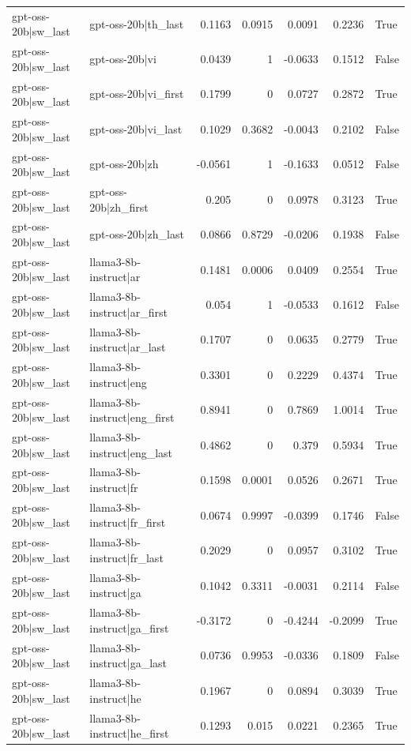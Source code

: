 \begin{table}
\begin{tabular}{l l r r r r l}
gpt-oss-20b|sw_last & gpt-oss-20b|th_last & 0.1163 & 0.0915 & 0.0091 & 0.2236 & True \\
gpt-oss-20b|sw_last & gpt-oss-20b|vi & 0.0439 & 1 & -0.0633 & 0.1512 & False \\
gpt-oss-20b|sw_last & gpt-oss-20b|vi_first & 0.1799 & 0 & 0.0727 & 0.2872 & True \\
gpt-oss-20b|sw_last & gpt-oss-20b|vi_last & 0.1029 & 0.3682 & -0.0043 & 0.2102 & False \\
gpt-oss-20b|sw_last & gpt-oss-20b|zh & -0.0561 & 1 & -0.1633 & 0.0512 & False \\
gpt-oss-20b|sw_last & gpt-oss-20b|zh_first & 0.205 & 0 & 0.0978 & 0.3123 & True \\
gpt-oss-20b|sw_last & gpt-oss-20b|zh_last & 0.0866 & 0.8729 & -0.0206 & 0.1938 & False \\
gpt-oss-20b|sw_last & llama3-8b-instruct|ar & 0.1481 & 0.0006 & 0.0409 & 0.2554 & True \\
gpt-oss-20b|sw_last & llama3-8b-instruct|ar_first & 0.054 & 1 & -0.0533 & 0.1612 & False \\
gpt-oss-20b|sw_last & llama3-8b-instruct|ar_last & 0.1707 & 0 & 0.0635 & 0.2779 & True \\
gpt-oss-20b|sw_last & llama3-8b-instruct|eng & 0.3301 & 0 & 0.2229 & 0.4374 & True \\
gpt-oss-20b|sw_last & llama3-8b-instruct|eng_first & 0.8941 & 0 & 0.7869 & 1.0014 & True \\
gpt-oss-20b|sw_last & llama3-8b-instruct|eng_last & 0.4862 & 0 & 0.379 & 0.5934 & True \\
gpt-oss-20b|sw_last & llama3-8b-instruct|fr & 0.1598 & 0.0001 & 0.0526 & 0.2671 & True \\
gpt-oss-20b|sw_last & llama3-8b-instruct|fr_first & 0.0674 & 0.9997 & -0.0399 & 0.1746 & False \\
gpt-oss-20b|sw_last & llama3-8b-instruct|fr_last & 0.2029 & 0 & 0.0957 & 0.3102 & True \\
gpt-oss-20b|sw_last & llama3-8b-instruct|ga & 0.1042 & 0.3311 & -0.0031 & 0.2114 & False \\
gpt-oss-20b|sw_last & llama3-8b-instruct|ga_first & -0.3172 & 0 & -0.4244 & -0.2099 & True \\
gpt-oss-20b|sw_last & llama3-8b-instruct|ga_last & 0.0736 & 0.9953 & -0.0336 & 0.1809 & False \\
gpt-oss-20b|sw_last & llama3-8b-instruct|he & 0.1967 & 0 & 0.0894 & 0.3039 & True \\
gpt-oss-20b|sw_last & llama3-8b-instruct|he_first & 0.1293 & 0.015 & 0.0221 & 0.2365 & True \\

\end{tabular}
\end{table}
